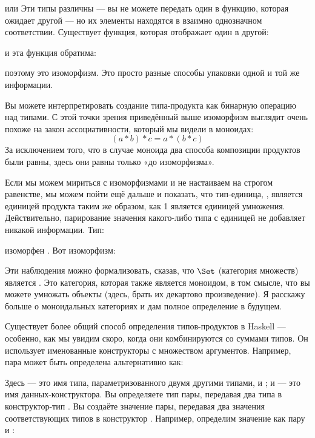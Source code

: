 
или
Эти типы различны — вы не можете передать один в функцию, которая ожидает другой — но их элементы находятся в взаимно однозначном соответствии. Существует функция, которая отображает один в другой:

и эта функция обратима:

поэтому это изоморфизм. Это просто разные способы упаковки одной и той же информации.

Вы можете интерпретировать создание типа-продукта как бинарную операцию над типами. С этой точки зрения приведённый выше изоморфизм выглядит очень похоже на закон ассоциативности, который мы видели в моноидах:
\[(a * b) * c = a * (b * c)\]
За исключением того, что в случае моноида два способа композиции продуктов были равны, здесь они равны только «до изоморфизма».

Если мы можем мириться с изоморфизмами и не настаиваем на строгом равенстве, мы можем пойти ещё дальше и показать, что тип-единица, \code{()}, является единицей продукта таким же образом, как 1 является единицей умножения. Действительно, парирование значения какого-либо типа  с единицей не добавляет никакой информации. Тип:

изоморфен . Вот изоморфизм:


Эти наблюдения можно формализовать, сказав, что $\Set$ (категория множеств) является . Это категория, которая также является моноидом, в том смысле, что вы можете умножать объекты (здесь, брать их декартово произведение). Я расскажу больше о моноидальных категориях и дам полное определение в будущем.

Существует более общий способ определения типов-продуктов в Haskell — особенно, как мы увидим скоро, когда они комбинируются со суммами типов. Он использует именованные конструкторы с множеством аргументов. Например, пара может быть определена альтернативно как:

Здесь  — это имя типа, параметризованного двумя другими типами,  и ; и  — это имя данных-конструктора. Вы определяете тип пары, передавая два типа в конструктор-тип . Вы создаёте значение пары, передавая два значения соответствующих типов в конструктор . Например, определим значение  как пару  и :

